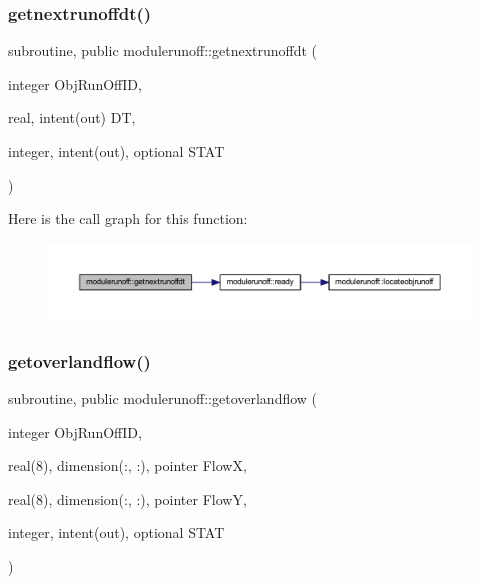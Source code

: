 \subsubsection{\texorpdfstring{getnextrunoffdt()}{getnextrunoffdt()}}
{\footnotesize\ttfamily subroutine, public modulerunoff\+::getnextrunoffdt (\begin{DoxyParamCaption}\item[{integer}]{Obj\+Run\+Off\+ID,  }\item[{real, intent(out)}]{DT,  }\item[{integer, intent(out), optional}]{S\+T\+AT }\end{DoxyParamCaption})}

Here is the call graph for this function\+:
\nopagebreak
\begin{figure}[H]
\begin{center}
\leavevmode
\includegraphics[width=350pt]{namespacemodulerunoff_a364cfd3bda8ba61cda13d20f848f20dc_cgraph}
\end{center}
\end{figure}
\mbox{\label{namespacemodulerunoff_a4d5da3ce5f5efddf1d2957ea8e1e1791}} 
\subsubsection{\texorpdfstring{getoverlandflow()}{getoverlandflow()}}
{\footnotesize\ttfamily subroutine, public modulerunoff\+::getoverlandflow (\begin{DoxyParamCaption}\item[{integer}]{Obj\+Run\+Off\+ID,  }\item[{real(8), dimension(\+:, \+:), pointer}]{FlowX,  }\item[{real(8), dimension(\+:, \+:), pointer}]{FlowY,  }\item[{integer, intent(out), optional}]{S\+T\+AT }\end{DoxyParamCaption})}


